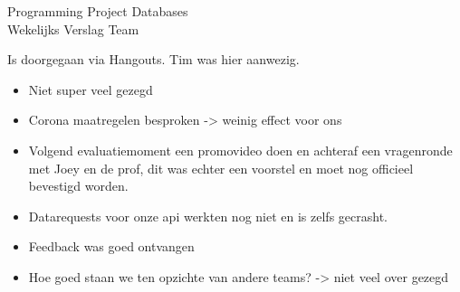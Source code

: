 \documentclass{article}
\newcounter{team}
\begin{document}

	\begin{Minutes}{Programming Project Databases \\ Wekelijks Verslag Team }
		\missingNoExcuse{/}
		\missingExcused{/}

		\maketitle

    		Is doorgegaan via Hangouts. Tim was hier aanwezig.
    		\begin{itemize}
    		    \item Niet super veel gezegd
    		    \item Corona maatregelen besproken -> weinig effect voor ons
    		    \item Volgend evaluatiemoment een promovideo doen en achteraf een vragenronde met Joey en de prof, dit was echter een voorstel en moet nog officieel bevestigd worden.
    		    \item Datarequests voor onze api werkten nog niet en is zelfs gecrasht.
    		    \item Feedback was goed ontvangen
    		    \item Hoe goed staan we ten opzichte van andere teams? -> niet veel over gezegd
    		\end{itemize}




\end{Minutes}
\end{document}
